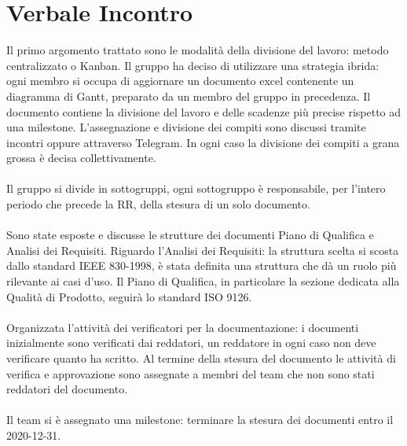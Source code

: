 \section{Verbale Incontro}
    Il primo argomento trattato sono le modalità della divisione del lavoro: metodo centralizzato o Kanban. Il gruppo ha deciso di utilizzare una strategia ibrida: ogni membro si occupa di aggiornare un documento excel contenente un diagramma di Gantt, preparato da un membro del gruppo in precedenza. Il documento contiene la divisione del lavoro e delle scadenze più precise rispetto ad una milestone. L'assegnazione e divisione dei compiti sono discussi tramite incontri oppure attraverso Telegram. In ogni caso la divisione dei compiti a grana grossa è decisa collettivamente.
    \\ \\
    \noindent Il gruppo si divide in sottogruppi, ogni sottogruppo è responsabile, per l'intero periodo che precede la RR, della stesura di un solo documento.
    \\ \\
    \noindent Sono state esposte e discusse le strutture dei documenti Piano di Qualifica e Analisi dei Requisiti. Riguardo l'Analisi dei Requisiti: la struttura scelta si scosta dallo standard IEEE 830-1998, è stata definita una struttura che dà un ruolo più rilevante ai casi d'uso. Il Piano di Qualifica, in particolare la sezione dedicata alla Qualità di Prodotto, seguirà lo standard ISO 9126. 
    \\ \\
    \noindent Organizzata l'attività dei verificatori per la documentazione: i documenti inizialmente sono verificati dai reddatori, un reddatore in ogni caso non deve verificare quanto ha scritto. Al termine della stesura del documento le attività di verifica e approvazione sono assegnate a membri del team che non sono stati reddatori del documento.
    \\ \\
    \noindent Il team si è assegnato una milestone: terminare la stesura dei documenti entro il 2020-12-31.
